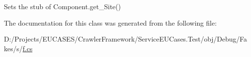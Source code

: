 Sets the stub of Component.\-get\-\_\-\-Site()



The documentation for this class was generated from the following file\-:\begin{DoxyCompactItemize}
\item 
D\-:/\-Projects/\-E\-U\-C\-A\-S\-E\-S/\-Crawler\-Framework/\-Service\-E\-U\-Cases.\-Test/obj/\-Debug/\-Fakes/s/\hyperlink{s_2f_8cs}{f.\-cs}\end{DoxyCompactItemize}
